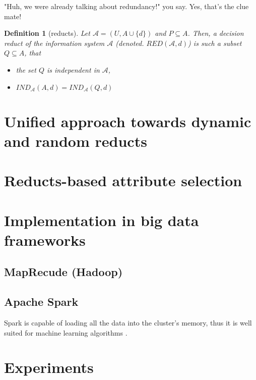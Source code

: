 \documentclass[12pt]{pracamgr}
\newtheorem{definition}{Definition}[chapter]
\begin{document}
"Huh, we were already talking about redundancy!" you say. Yes, that's the clue mate!

\begin{definition}[reducts]

  Let $\mathcal{A} = (U, A \cup \{d\})$  and $P \subseteq A$. Then, a \emph{decision reduct
  of the information system $\mathcal{A}$} (denoted. $RED(\mathcal{A}, d)$) is such a
  subset $Q \subseteq A$, that
  \begin{itemize}
    \item the set $Q$ is independent in $\mathcal{A}$,
    \item $IND_\mathcal{A}(A, d) = IND_\mathcal{A}(Q, d)$
  \end{itemize}

\end{definition}




\chapter{Unified approach towards dynamic and random reducts}
\label{chap:dynamicrandomreducts}


\chapter{Reducts-based attribute selection}
\label{chap:reductsattrsel}
  
  
\chapter{Implementation in big data frameworks}
\label{chap:implattlsel}

\section{MapRecude (Hadoop)}

\section{Apache Spark}

Spark is capable of loading all the data into the cluster's memory, thus it is well suited for machine learning algorithms \cite{zaharia}.


\chapter{Experiments}
\label{chap:experiments}
\end{document}
